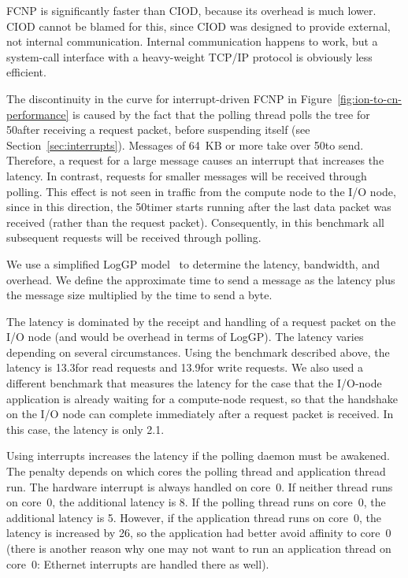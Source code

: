 \documentclass[journal]{IEEEtran}
\begin{document}
FCNP is significantly faster than CIOD, because its overhead is much lower.
CIOD cannot be blamed for this, since CIOD was designed to provide external,
not internal communication.
Internal communication happens to work, but a system-call interface with a
heavy-weight TCP/IP protocol is obviously less efficient.

The discontinuity in the curve for interrupt-driven FCNP in
Figure~\ref{fig:ion-to-cn-performance} is caused by the fact that the polling
thread polls the tree for 50\us after receiving a request packet, before
suspending itself (see Section~\ref{sec:interrupts}).
Messages of 64~KB or more take over 50\us to send.
Therefore, a request for a large message causes an interrupt that increases the
latency.
In contrast, requests for smaller messages will be received through polling.
This effect is not seen in traffic from the compute node to the I/O node,
since in this direction, the 50\us timer starts running after the last
data packet was received (rather than the request packet).
Consequently, in this benchmark all subsequent requests will be received
through polling.

We use a simplified LogGP model~\cite{Alexandrov:95} to determine the
latency, bandwidth, and overhead.
We define the approximate time to send a message as the latency plus the
message size multiplied by the time to send a byte.

The latency is dominated by the receipt and handling of a request packet on the
I/O node (and would be overhead in terms of LogGP).
The latency varies depending on several circumstances.
Using the benchmark described above, the latency is 13.3\us for read
requests and 13.9\us for write requests.
We also used a different benchmark that measures the latency for the case
that the I/O-node application is already waiting for a compute-node request,
so that the handshake on the I/O node can complete immediately after a request
packet is received.
In this case, the latency is only 2.1\us.

Using interrupts increases the latency if the polling daemon must be
awakened.
The penalty depends on which cores the polling thread and application thread
run.
The hardware interrupt is always handled on core~0.
If neither thread runs on core~0, the additional latency is 8\us.
If the polling thread runs on core~0, the additional latency is 5\us.
However, if the application thread runs on core~0, the latency is increased
by 26\us, so the application had better avoid affinity to core~0
(there is another reason why one may not want to run an application thread on
core~0: Ethernet interrupts are handled there as well).
\end{document}
